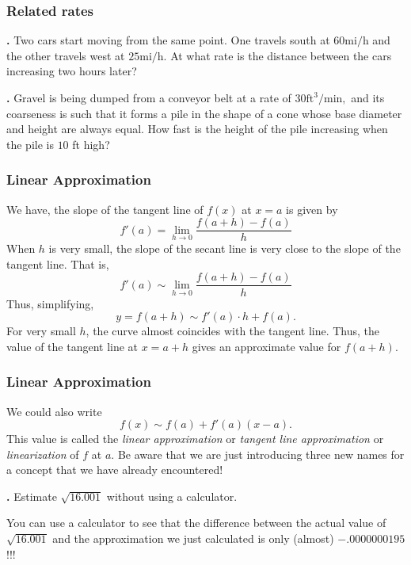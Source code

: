 \documentclass[t]{beamer}
\theoremstyle{plain}
\theoremstyle{definition}
\newcounter{heading}
\newcommand{\newhead}[1]{\medskip\stepcounter{heading}\noindent\textbf{\hspace{0.2cm}{#1}.}}
\begin{document}
\begin{frame}
\frametitle{Related rates}


\newhead{Example (Stewart, Problem 2.7.13)} Two cars start moving from the same point.  One travels south at $60\mathrm{ mi}/\mathrm{h}$ and the other travels west at $25\mathrm{ mi}/\mathrm{h}$.  At what rate is the distance between the cars increasing two hours later?\pause

\smallskip

\newhead{Example (Stewart, Problem 2.7.25)} Gravel is being dumped from a conveyor belt at a rate of $30\mathrm{ft}^{3}/\mathrm{min},$ and its coarseness is such that it forms a pile in the shape of a cone whose base diameter and height are always equal.  How fast is the height of the pile increasing when the pile is $10$ ft high?
\end{frame}

\frame
{
\frametitle{Linear Approximation}
We have, the slope of the tangent line of $f(x)$ at $x=a$ is given by
\[ f'(a)=\lim_{h\to 0}\frac{f(a+h)-f(a)}{h} \] \pause
When $h$ is very small, the slope of the secant line is very close to the slope of the tangent line. \pause That is,
\[ f'(a)\sim\lim_{h\to 0}\frac{f(a+h)-f(a)}{h} \]\pause Thus, simplifying,
\[ y=f(a+h)\sim f'(a)\cdot h +f(a). \] \pause
For very small $h$, the curve almost coincides with the tangent line. Thus, the value of the tangent line at $x=a+h$
gives an approximate value for $f(a+h)$. 
}

\frame
{
\frametitle{Linear Approximation}
We could also write $$f(x) \sim f(a) + f'(a)(x-a).$$ This value is called the {\em linear approximation}  or \emph{tangent line approximation} or {\em linearization} of $f$ at $a$.  Be aware that we are just introducing three new names for a concept that we have already encountered!  \pause



\newhead{Example} Estimate $\sqrt{16.001}$ without using a calculator.\pause

\vfill



\noindent You can use a calculator to see that the difference between the actual value of $\sqrt{16.001}$ and the approximation we just calculated is only (almost) $-.0000000195$!!!
}
\end{document}

